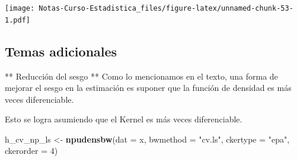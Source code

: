 \documentclass[
  12pt,
]{book}
\newenvironment{Shaded}{\begin{snugshade}}{\end{snugshade}}
\newcommand{\DataTypeTok}[1]{\textcolor[rgb]{0.13,0.29,0.53}{#1}}
\newcommand{\DecValTok}[1]{\textcolor[rgb]{0.00,0.00,0.81}{#1}}
\newcommand{\KeywordTok}[1]{\textcolor[rgb]{0.13,0.29,0.53}{\textbf{#1}}}
\newcommand{\NormalTok}[1]{#1}
\newcommand{\OperatorTok}[1]{\textcolor[rgb]{0.81,0.36,0.00}{\textbf{#1}}}
\newcommand{\StringTok}[1]{\textcolor[rgb]{0.31,0.60,0.02}{#1}}
\theoremstyle{definition}
\theoremstyle{definition}
\theoremstyle{definition}
\theoremstyle{remark}
\begin{document}
\begin{Shaded}
\end{Shaded}

\texttt{[image: Notas-Curso-Estadistica\_files/figure-latex/unnamed-chunk-53-1.pdf]}

\hypertarget{temas-adicionales}{%
\subsection{Temas adicionales}\label{temas-adicionales}}

** Reducción del sesgo **
Como lo mencionamos en el texto, una forma de mejorar el sesgo en la estimación es suponer que la función de densidad es más veces diferenciable.

Esto se logra asumiendo que el Kernel es más veces diferenciable.

\begin{Shaded}
\begin{Highlighting}[]
\NormalTok{h_cv_np_ls <-}\StringTok{ }\KeywordTok{npudensbw}\NormalTok{(}\DataTypeTok{dat =}\NormalTok{ x, }\DataTypeTok{bwmethod =} \StringTok{"cv.ls"}\NormalTok{, }
    \DataTypeTok{ckertype =} \StringTok{"epa"}\NormalTok{, }\DataTypeTok{ckerorder =} \DecValTok{4}\NormalTok{)}
\end{Highlighting}
\end{Shaded}
\end{document}
